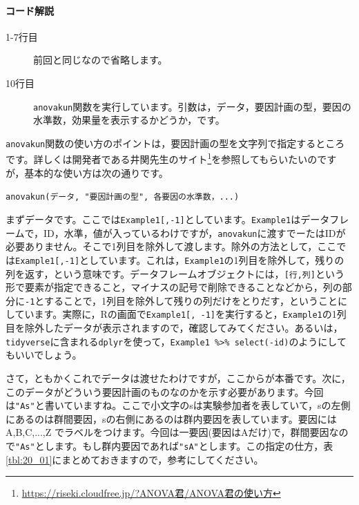 \documentclass{ltjbook}
\begin{document}
\paragraph{コード解説}
\begin{description}
	\item[1-7行目] 前回と同じなので省略します。
	\item[10行目] \verb|anovakun|関数を実行しています。引数は，データ，要因計画の型，要因の水準数，効果量を表示するかどうか，です。
\end{description}

\verb|anovakun|関数の使い方のポイントは，要因計画の型を文字列で指定するところです。詳しくは開発者である井関先生のサイト\footnote{\url{https://riseki.cloudfree.jp/?ANOVA君/ANOVA君の使い方}}を参照してもらいたいのですが，基本的な使い方は次の通りです。

\verb|anovakun(データ, "要因計画の型", 各要因の水準数，...)|

まずデータです。ここでは\verb|Example1[,-1]|としています。\verb|Example1|はデータフレームで，ID，水準，値が入っているわけですが，\verb|anovakun|に渡すでーたはIDが必要ありません。そこで1列目を除外して渡します。除外の方法として，ここでは\verb|Example1[,-1]|としています。これは，\verb|Example1|の1列目を除外して，残りの列を返す，という意味です。データフレームオブジェクトには，\verb|[行,列]|という形で要素が指定できること，マイナスの記号で削除できることなどから，列の部分に\verb|-1|とすることで，1列目を除外して残りの列だけをとりだす，ということにしています。実際に，Rの画面で\verb|Example1[, -1]|を実行すると，\verb|Example1|の1列目を除外したデータが表示されますので，確認してみてください。あるいは，\verb|tidyverse|に含まれる\verb|dplyr|を使って，\verb|Example1 %>% select(-id)|のようにしてもいいでしょう。

さて，ともかくこれでデータは渡せたわけですが，ここからが本番です。次に，このデータがどういう要因計画のものなのかを示す必要があります。今回は\verb|"As"|と書いていますね。ここで小文字のsは実験参加者を表していて，sの左側にあるのは群間要因，sの右側にあるのは群内要因を表しています。要因にはA,B,C,...,Z でラベルをつけます。今回は一要因(要因はAだけ)で，群間要因なので\verb|"As"|とします。もし群内要因であれば\verb|"sA"|とします。この指定の仕方，表\ref{tbl:20_01}にまとめておきますので，参考にしてください。
\end{document}
